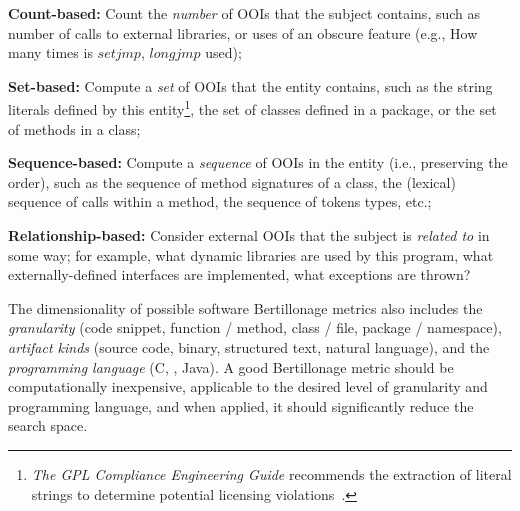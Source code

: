 \begin{description}

\item{\bf Count-based:} Count the \emph{number} of OOIs that the subject
    contains, such as number of calls to external libraries, or uses of an
    obscure feature (e.g., How many times is $setjmp$, $longjmp$ used); 

\item{\bf Set-based:} Compute a \emph{set} of OOIs that the entity contains,
    such as the string literals defined by this entity\footnote{\emph{The
    GPL Compliance Engineering Guide} recommends the extraction of literal
    strings to determine potential licensing
    violations~\cite{GPLcomplianceGuide}.}, the set of classes defined in a
    package, or the set of methods in a class;

\item{\bf Sequence-based:} Compute a \emph{sequence} of OOIs in the entity
    (i.e., preserving the order), such as the sequence of method
    signatures of a class, the (lexical) sequence of calls within a method,
    the sequence of tokens types, etc.; 

\item{\bf Relationship-based:} Consider external OOIs that the subject is
    \emph{related to} in some way; for example, what dynamic libraries are
    used by this program, what externally-defined interfaces are
    implemented, what exceptions are thrown?


\end{description}

The dimensionality of possible software Bertillonage metrics also includes
the \emph{granularity} (code snippet, function / method, class / file,
package / namespace), \emph{artifact kinds} (source code, binary,
structured text, natural language), and the \emph{programming language} (C,
\Cpp, Java).  A good Bertillonage  metric should be computationally
inexpensive, applicable to the desired level of granularity and programming
language, and when applied, it should significantly reduce the search
space.



